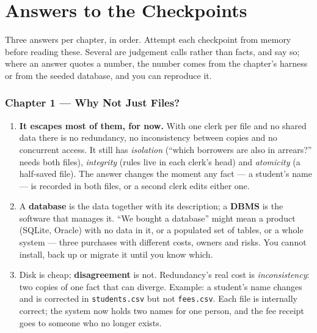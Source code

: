 \chapter{Answers to the Checkpoints}\label{app:answers}
\normalfigures

Three answers per chapter, in order. Attempt each checkpoint from memory before
reading these. Several are judgement calls rather than facts, and say so; where
an answer quotes a number, the number comes from the chapter's harness or from
the seeded database, and you can reproduce it.

\newcommand{\ansch}[1]{\subsection*{\color{primary}Chapter #1}}
\newenvironment{ans}
  {\begin{enumerate}[leftmargin=*, itemsep=4pt, topsep=3pt,
                     label=\textbf{\arabic*.}]}
  {\end{enumerate}}

\ansch{1 --- Why Not Just Files?}
\begin{ans}
  \item \textbf{It escapes most of them, for now.} With one clerk per file and
        no shared data there is no redundancy, no inconsistency between copies
        and no concurrent access. It still has \emph{isolation} (``which
        borrowers are also in arrears?'' needs both files), \emph{integrity}
        (rules live in each clerk's head) and \emph{atomicity} (a half-saved
        file). The answer changes the moment any fact --- a student's name ---
        is recorded in both files, or a second clerk edits either one.
  \item A \textbf{database} is the data together with its description; a
        \textbf{DBMS} is the software that manages it. ``We bought a database''
        might mean a product (SQLite, Oracle) with no data in it, or a
        populated set of tables, or a whole system --- three purchases with
        different costs, owners and risks. You cannot install, back up or
        migrate it until you know which.
  \item Disk is cheap; \textbf{disagreement} is not. Redundancy's real cost is
        \emph{inconsistency}: two copies of one fact that can diverge. Example:
        a student's name changes and is corrected in \texttt{students.csv} but
        not \texttt{fees.csv}. Each file is internally correct; the system now
        holds two names for one person, and the fee receipt goes to someone
        who no longer exists.
\end{ans}

